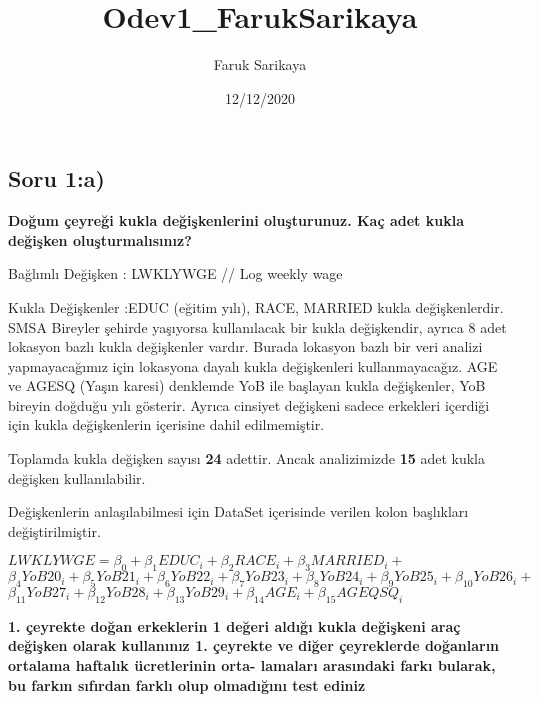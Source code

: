 \documentclass[
]{article}
\title{Odev1\_FarukSarikaya}
\author{Faruk Sarikaya}
\date{12/12/2020}
\begin{document}
\maketitle

\hypertarget{soru-1a}{%
\subsection{Soru 1:a)}\label{soru-1a}}

\textbf{Doğum çeyreği kukla değişkenlerini oluşturunuz. Kaç adet kukla
değişken oluşturmalısınız?}

Bağlımlı Değişken : LWKLYWGE // Log weekly wage

Kukla Değişkenler :EDUC (eğitim yılı), RACE, MARRIED kukla
değişkenlerdir. SMSA Bireyler şehirde yaşıyorsa kullanılacak bir kukla
değişkendir, ayrıca 8 adet lokasyon bazlı kukla değişkenler vardır.
Burada lokasyon bazlı bir veri analizi yapmayacağımız için lokasyona
dayalı kukla değişkenleri kullanmayacağız. AGE ve AGESQ (Yaşın karesi)
denklemde YoB ile başlayan kukla değişkenler, YoB bireyin doğduğu yılı
gösterir. Ayrıca cinsiyet değişkeni sadece erkekleri içerdiği için kukla
değişkenlerin içerisine dahil edilmemiştir.

Toplamda kukla değişken sayısı \textbf{24} adettir. Ancak analizimizde
\textbf{15} adet kukla değişken kullanılabilir.

Değişkenlerin anlaşılabilmesi için DataSet içerisinde verilen kolon
başlıkları değiştirilmiştir.

\(LWKLYWGE = \beta_0 + \beta_1EDUC_i + \beta_2RACE_i + \beta_3MARRIED_i +\)
\(\beta_4YoB20_i + \beta_5YoB21_i +\beta_6YoB22_i + \beta_7YoB23_i + \beta_8YoB24_i + \beta_9YoB25_i + \beta_{10}YoB26_i+\)
\(\beta_{11}YoB27_i + \beta_{12}YoB28_i + \beta_{13}YoB29_i + \beta_{14}AGE_i + \beta_{15}AGEQSQ_i\)

\textbf{1. çeyrekte doğan erkeklerin 1 değeri aldığı kukla değişkeni
araç değişken olarak kullanınız 1. çeyrekte ve diğer çeyreklerde
doğanların ortalama haftalık ücretlerinin orta- lamaları arasındaki
farkı bularak, bu farkın sıfırdan farklı olup olmadığını test ediniz}
\end{document}
